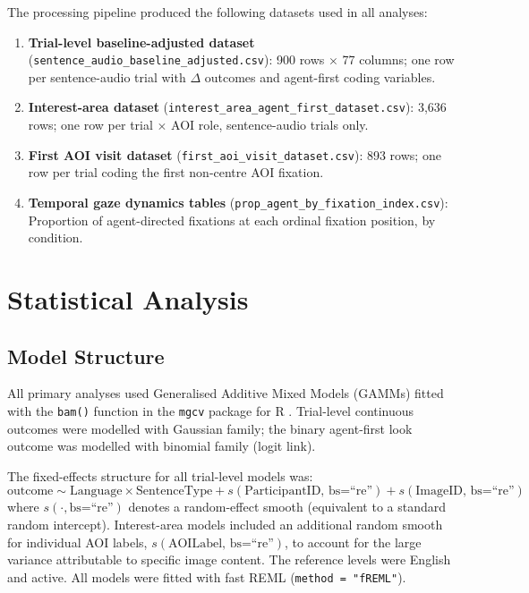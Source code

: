 \documentclass[12pt, a4paper]{article}
\begin{document}
The processing pipeline produced the following datasets used in all analyses:

\begin{enumerate}
  \item \textbf{Trial-level baseline-adjusted dataset}
        (\texttt{sentence\_audio\_baseline\_adjusted.csv}):
        900 rows $\times$ 77 columns; one row per sentence-audio trial with
        $\Delta$ outcomes and agent-first coding variables.
  \item \textbf{Interest-area dataset}
        (\texttt{interest\_area\_agent\_first\_dataset.csv}):
        3,636 rows; one row per trial $\times$ AOI role, sentence-audio trials only.
  \item \textbf{First AOI visit dataset}
        (\texttt{first\_aoi\_visit\_dataset.csv}):
        893 rows; one row per trial coding the first non-centre AOI fixation.
  \item \textbf{Temporal gaze dynamics tables}
        (\texttt{prop\_agent\_by\_fixation\_index.csv}):
        Proportion of agent-directed fixations at each ordinal fixation position,
        by condition.
\end{enumerate}

\section{Statistical Analysis}

\subsection{Model Structure}

All primary analyses used Generalised Additive Mixed Models (GAMMs) fitted
with the \texttt{bam()} function in the \texttt{mgcv} package for R \citep{Wood2017}.
Trial-level continuous outcomes were modelled with Gaussian family; the binary
agent-first look outcome was modelled with binomial family (logit link).

The fixed-effects structure for all trial-level models was:
\begin{equation}
  \text{outcome} \sim \text{Language} \times \text{SentenceType}
    + s(\text{ParticipantID}, \, \text{bs=``re''})
    + s(\text{ImageID}, \, \text{bs=``re''})
\end{equation}
where $s(\cdot, \text{bs=``re''})$ denotes a random-effect smooth
(equivalent to a standard random intercept).
Interest-area models included an additional random smooth for individual
AOI labels, $s(\text{AOILabel}, \, \text{bs=``re''})$, to account for the
large variance attributable to specific image content.
The reference levels were English and active.
All models were fitted with fast REML (\texttt{method = "fREML"}).
\end{document}

